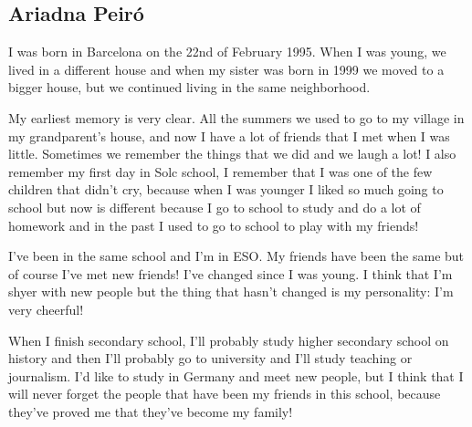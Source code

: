 
\subsection*{Ariadna Peiró}

I was born in Barcelona on the 22nd of February 1995. When I was young, we lived in a different house and when my sister was born in 1999 we moved to a bigger house, but we continued living in the same neighborhood.

My earliest memory is very clear. All the summers we used to go to my village in my grandparent’s house, and now I have a lot of friends that I met when I was little. Sometimes we remember the things that we did and we laugh a lot! I also remember my first day in Solc school, I remember that I was one of the few children that didn’t cry, because when I was younger I liked so much going to school but now is different because I go to school to study and do a lot of homework and in the past I used to go to school to play with my friends!

I’ve been in the same school and I’m in ESO. My friends have been the same but of course I’ve met new friends! I’ve changed since I was young. I think that I’m shyer with new people but the thing that hasn’t changed is my personality: I’m very cheerful!

When I finish secondary school, I’ll probably study higher secondary school on history and then I’ll probably go to university and I’ll study teaching or journalism. I’d like to study in Germany and meet new people, but I think that I will never forget the people that have been my friends in this school, because they’ve proved me that they’ve become my family!



